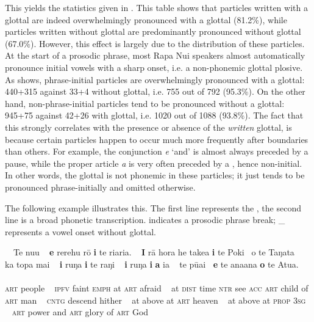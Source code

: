 This yields the statistics given in . This table shows that particles written with a glottal are indeed overwhelmingly pronounced with a glottal (81.2\%), while particles written without glottal are predominantly pronounced without glottal (67.0\%). However, this effect is largely due to the distribution of these particles. At the start of a prosodic phrase, most Rapa Nui speakers almost automatically pronounce initial vowels with a sharp onset, i.e. a non-phonemic glottal plosive. As  shows, phrase-initial particles are overwhelmingly pronounced with a glottal: 440+315 against 33+4 without glottal, i.e. 755 out of 792 (95.3\%). On the other hand, non-phrase-initial particles tend to be pronounced without a glottal: 945+75 against 42+26 with glottal, i.e. 1020 out of 1088 (93.8\%). The fact that this strongly correlates with the presence or absence of the \textit{written} glottal, is because certain particles happen to occur much more frequently after boundaries than others. For example, the conjunction \textit{{\ꞌ}e} ‘and’ is almost always preceded by a pause, while the proper article \textit{a} is very often preceded by a , hence non-initial. In other words, the glottal is not phonemic in these particles; it just tends to be pronounced phrase-initially and omitted otherwise.

The following example illustrates this. The first line represents the , the second line is a broad phonetic transcription. {\textbar} indicates a prosodic phrase break; \_  represents a vowel onset without glottal.

\ea\label{ex:2.1}
\glll  ~~Te nu{\ꞌ}u ~ \textbf{e} rerehu rō \textbf{{\ꞌ}i} te ri{\ꞌ}ari{\ꞌ}a. ~ \textbf{{\ꞌ}I} rā hora he take{\ꞌ}a \textbf{i} te Poki ~o te Taŋata ~ ka topa mai ~  \textbf{{\ꞌ}i} ruŋa \textbf{i} te raŋi ~ \textbf{{\ꞌ}i} ruŋa \textbf{i} \textbf{a} ia  ~ te pūai \textbf{~{\ꞌ}e} te {\ꞌ}ana{\ꞌ}ana \textbf{o} te {\ꞌ}Atua.\\
[~te nuʔu {\textbar} \textbf{ʔe} rerehu roː \textbf{\_i} te riʔariʔa {\textbar} \textbf{ʔi} raː hora he takea \textbf{\_i} te poki \textbf{\_o} te taŋata {\textbar} ka topa mai {\textbar} \textbf{ʔi} ruŋa \textbf{\_i} te raŋi {\textbar} \textbf{ʔi} ruŋa \textbf{\_i} \textbf{\_a} ia {\textbar} te puːai \textbf{ʔe} te ʔanaʔana \textbf{\_o} te ʔatua~]\\
\textsc{art} people ~ \textsc{ipfv} faint \textsc{emph} at \textsc{art} afraid  ~  at \textsc{dist} time \textsc{ntr} see \textsc{acc} \textsc{art} child of \textsc{art} man  ~  \textsc{cntg} descend hither  ~  at above at \textsc{art} heaven  ~  at above at \textsc{prop} \textsc{3sg}  ~  \textsc{art} power and \textsc{art} glory of \textsc{art} God\\

